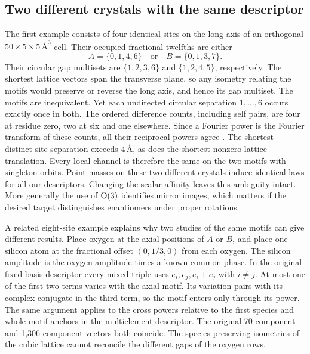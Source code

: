 \subsection{Two different crystals with the same descriptor}\label{app:collision}
The first example consists of four identical sites on the long axis of an orthogonal \(50\times5\times5\,\text{\AA}^3\) cell. Their occupied fractional twelfths are either
\[
 A=\{0,1,4,6\}\quad\text{or}\quad B=\{0,1,3,7\}.
\]
Their circular gap multisets are \(\{1,2,3,6\}\) and \(\{1,2,4,5\}\), respectively. The shortest lattice vectors span the transverse plane, so any isometry relating the motifs would preserve or reverse the long axis, and hence its gap multiset. The motifs are inequivalent. Yet each undirected circular separation \(1,\ldots,6\) occurs exactly once in both. The ordered difference counts, including self pairs, are four at residue zero, two at six and one elsewhere. Since a Fourier power is the Fourier transform of these counts, all their reciprocal powers agree \cite{zrelation,homometry}. The shortest distinct-site separation exceeds \(4\,\text{\AA}\), as does the shortest nonzero lattice translation. Every local channel is therefore the same on the two motifs with singleton orbits. Point masses on these two different crystals induce identical laws for all our descriptors. Changing the scalar affinity leaves this ambiguity intact. More generally the use of \({\rm O}(3)\) identifies mirror images, which matters if the desired target distinguishes enantiomers under proper rotations \cite{degenerate}.

A related eight-site example explains why two studies of the same motifs can give different results. Place oxygen at the axial positions of \(A\) or \(B\), and place one silicon atom at the fractional offset \((0,1/3,0)\) from each oxygen. The silicon amplitude is the oxygen amplitude times a known common phase. In the original fixed-basis descriptor every mixed triple uses \(e_i,e_j,e_i+e_j\) with \(i\ne j\). At most one of the first two terms varies with the axial motif. Its variation pairs with its complex conjugate in the third term, so the motif enters only through its power. The same argument applies to the cross powers relative to the first species and whole-motif anchors in the multielement descriptor. The original 70-component and 1,306-component vectors both coincide. The species-preserving isometries of the cubic lattice cannot reconcile the different gaps of the oxygen rows.

